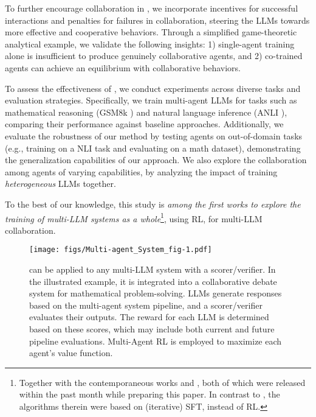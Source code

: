 To further encourage collaboration in \ourstwo, we incorporate incentives for successful interactions and penalties for failures in collaboration, steering the LLMs    towards more effective and cooperative behaviors. Through a simplified game-theoretic  analytical  example, we validate the following insights: 1) single-agent training alone is insufficient to produce genuinely collaborative agents, and 2) co-trained agents can achieve an equilibrium with collaborative behaviors. 

To assess the effectiveness of \ourstwo, we conduct  experiments across diverse tasks and evaluation strategies. Specifically, we train multi-agent LLMs for tasks such as mathematical reasoning (GSM8k \citep{cobbe2021training}) and natural language inference (ANLI \citep{nie2019adversarial}), comparing their performance against baseline approaches. Additionally, we evaluate the robustness of our method by testing agents on out-of-domain tasks (e.g., training on a NLI task and evaluating on a math dataset), demonstrating the generalization capabilities of our approach. We also explore the collaboration among agents of varying capabilities, by analyzing the impact of training {\it heterogeneous} LLMs together.


To the best of our knowledge, this study is \textit{among the first works to explore the training of multi-LLM  systems as a whole}\footnote{Together with the contemporaneous works \citet{subramaniam2025multiagent} and \citet{zhao2025sirius},  both of which were released within the past month while preparing this paper.
In contrast to \ourstwo, the algorithms therein were based on (iterative) SFT, instead of RL.}, 
using RL,  for multi-LLM collaboration. 







\begin{figure*}[t]  %
  \centering
  \texttt{[image: figs/Multi-agent\_System\_fig-1.pdf]}
  \safevspace{-8mm}
  \caption{
  \oursspace can be applied to any multi-{LLM}  system with a scorer/verifier. In the illustrated example, it is integrated into a collaborative debate system for mathematical problem-solving. LLMs generate responses based on the multi-agent system pipeline, and a scorer/verifier evaluates their outputs. The reward for each LLM is determined based on these scores, which may include both current and future pipeline evaluations. Multi-Agent RL is employed to maximize each agent's value function.}
  \safevspace{-0.75cm}
  \label{fig1:problem-setting}
\end{figure*}


